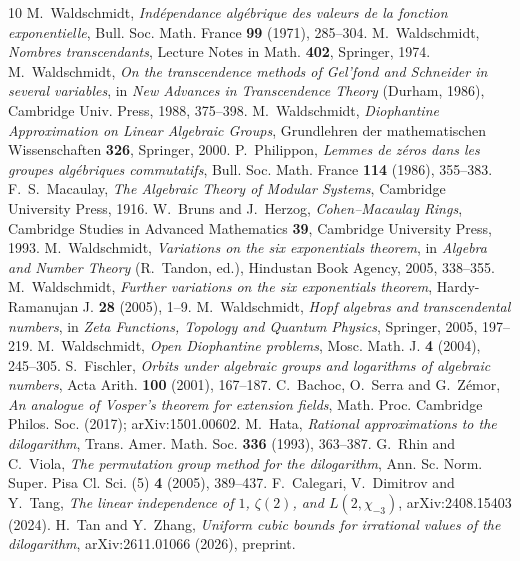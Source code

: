 \documentclass[11pt,a4paper]{article}
\theoremstyle{plain}
\theoremstyle{definition}
\begin{document}
\begin{thebibliography}{10}
 M.~Waldschmidt, \emph{Indépendance algébrique des valeurs de la
fonction exponentielle}, Bull. Soc. Math. France \textbf{99} (1971), 285--304.
 M.~Waldschmidt, \emph{Nombres transcendants}, Lecture Notes in Math.
\textbf{402}, Springer, 1974.
 M.~Waldschmidt, \emph{On the transcendence methods of Gel'fond and
Schneider in several variables}, in \emph{New Advances in Transcendence Theory} (Durham, 1986),
Cambridge Univ. Press, 1988, 375--398.
 M.~Waldschmidt, \emph{Diophantine Approximation on Linear Algebraic
Groups}, Grundlehren der mathematischen Wissenschaften \textbf{326}, Springer, 2000.
 P.~Philippon, \emph{Lemmes de z\'eros dans les groupes alg\'ebriques
commutatifs}, Bull. Soc. Math. France \textbf{114} (1986), 355--383.
 F.~S.~Macaulay, \emph{The Algebraic Theory of Modular Systems}, Cambridge University
Press, 1916.
 W.~Bruns and J.~Herzog, \emph{Cohen--Macaulay Rings}, Cambridge Studies in Advanced
Mathematics \textbf{39}, Cambridge University Press, 1993.
 M.~Waldschmidt, \emph{Variations on the six exponentials theorem}, in
\emph{Algebra and Number Theory} (R.~Tandon, ed.), Hindustan Book Agency, 2005, 338--355.
 M.~Waldschmidt, \emph{Further variations on the six exponentials
theorem}, Hardy-Ramanujan J. \textbf{28} (2005), 1--9.
 M.~Waldschmidt, \emph{Hopf algebras and transcendental numbers}, in
\emph{Zeta Functions, Topology and Quantum Physics}, Springer, 2005, 197--219.
 M.~Waldschmidt, \emph{Open Diophantine problems}, Mosc. Math. J.
\textbf{4} (2004), 245--305.
 S.~Fischler, \emph{Orbits under algebraic groups and logarithms of algebraic
numbers}, Acta Arith. \textbf{100} (2001), 167--187.
 C.~Bachoc, O.~Serra and G.~Z\'emor, \emph{An analogue of Vosper's theorem for extension fields}, Math. Proc. Cambridge Philos. Soc. (2017); arXiv:1501.00602.
 M.~Hata, \emph{Rational approximations to the dilogarithm}, Trans. Amer. Math.
Soc. \textbf{336} (1993), 363--387.
 G.~Rhin and C.~Viola, \emph{The permutation group method for the
dilogarithm}, Ann. Sc. Norm. Super. Pisa Cl. Sci. (5) \textbf{4} (2005), 389--437.
 F.~Calegari, V.~Dimitrov and Y.~Tang, \emph{The linear independence
of $1$, $\zeta(2)$, and $L(2,\chi_{-3})$}, arXiv:2408.15403 (2024).
 H.~Tan and Y.~Zhang, \emph{Uniform cubic bounds for irrational values of the dilogarithm},
arXiv:2611.01066 (2026), preprint.


\end{thebibliography}
\end{document}
